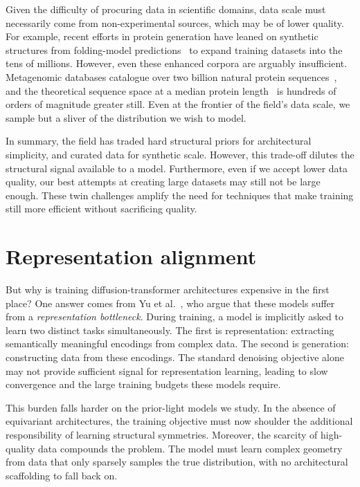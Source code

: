 \documentclass[12pt,a4paper,twoside]{report}
\begin{document}
Given the difficulty of procuring data in scientific domains, data scale must necessarily come from non-experimental sources, which may be of lower quality. For example, recent efforts in protein generation have leaned on synthetic structures from folding-model predictions~\cite{Proteina,AFDB} to expand training datasets into the tens of millions. However, even these enhanced corpora are arguably insufficient. Metagenomic databases catalogue over two billion natural protein sequences~\cite{MGnify}, and the theoretical sequence space at a median protein length~\cite{BrocchieriKarlin} is hundreds of orders of magnitude greater still. Even at the frontier of the field's data scale, we sample but a sliver of the distribution we wish to model.

In summary, the field has traded hard structural priors for architectural simplicity, and curated data for synthetic scale. However, this trade-off dilutes the structural signal available to a model. Furthermore, even if we accept lower data quality, our best attempts at creating large datasets may still not be large enough. These twin challenges amplify the need for techniques that make training still more efficient without sacrificing quality.

\section{Representation alignment}

But why is training diffusion-transformer architectures expensive in the first place? One answer comes from Yu et al.~\cite{REPA}, who argue that these models suffer from a \emph{representation bottleneck}. During training, a model is implicitly asked to learn two distinct tasks simultaneously. The first is representation: extracting semantically meaningful encodings from complex data. The second is generation: constructing data from these encodings. The standard denoising objective alone may not provide sufficient signal for representation learning, leading to slow convergence and the large training budgets these models require.

This burden falls harder on the prior-light models we study. In the absence of equivariant architectures, the training objective must now shoulder the additional responsibility of learning structural symmetries. Moreover, the scarcity of high-quality data compounds the problem. The model must learn complex geometry from data that only sparsely samples the true distribution, with no architectural scaffolding to fall back on.
\end{document}
